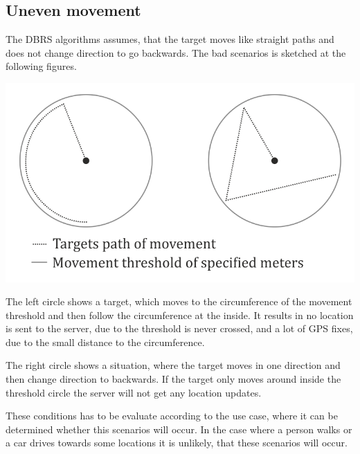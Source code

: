 \subsection{Uneven movement}
The DBRS algorithms assumes, that the target moves like straight paths and does not change direction to go backwards. The bad scenarios is sketched at the following figures.

\includegraphics{UnevenMovement}

The left circle shows a target, which moves to the circumference of the movement threshold and then follow the circumference at the inside. It results in no location is sent to the server, due to the threshold is never crossed, and a lot of GPS fixes, due to the small distance to the circumference.

The right circle shows a situation, where the target moves in one direction and then change direction to backwards. If the target only moves around inside the threshold circle the server will not get any location updates.

These conditions has to be evaluate according to the use case, where it can be determined whether this scenarios will occur. In the case where a person walks or a car drives towards some locations it is unlikely, that these scenarios will occur.